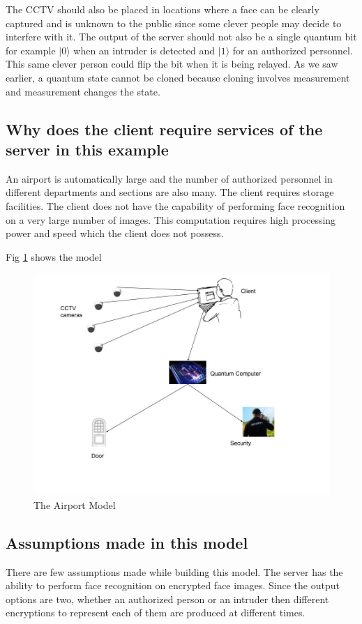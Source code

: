 The CCTV should also be placed in locations where a face can be clearly captured and is unknown to the public since some clever people may decide to interfere with it. The output of the server should not also be a single quantum bit for example $|0 \rangle$ when an intruder is detected and $|1\rangle$ for an authorized personnel. This same clever person could flip the bit when it is being relayed. As we saw earlier, a quantum state cannot be cloned because cloning involves measurement and measurement changes the state.  

\subsection{Why does the client require services of the server in this example}
An airport is automatically large and the number of authorized personnel in different departments and sections are also many. The client requires storage facilities. The client does not have the capability of performing face recognition on a very large number of images. This computation requires high processing power and speed which the client does not possess. 

Fig \ref{fig2: The Airport Model} shows the model

\begin{figure}[h]
\center
\includegraphics[scale=0.5]{images/Model2.jpg}
\caption{The Airport Model} 
\label{fig2: The Airport Model}
\end{figure}

\newpage
\subsection{Assumptions made in this model}
There are few assumptions made while building this model. The server has the ability to perform face recognition on encrypted face images. Since the output options are two, whether an authorized person or an intruder then different encryptions to represent each of them are produced at different times.

